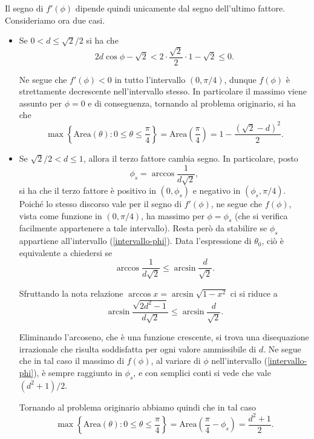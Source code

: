 {Il segno di $f'(\phi)$ dipende quindi unicamente dal segno 
dell'ultimo fattore. Consideriamo ora due casi.
\begin{itemize}
	\item  Se $0<d\leq\sqrt{2}/2$ si ha che
	$$2d\cos\phi-\sqrt{2}<2\cdot\frac{\sqrt{2}}{2}\cdot 
	1-\sqrt{2}\leq 0.$$
	
	Ne segue che $f'(\phi)<0$ in tutto l'intervallo $(0,\pi/4)$, 
	dunque $f(\phi)$ \`{e} strettamente decrescente nell'intervallo 
	stesso. In particolare il massimo viene assunto per $\phi=0$ e di 
	conseguenza, tornando al problema originario, si ha che
	$$\max\left\{\mbox{Area}(\theta):
	0\leq\theta\leq\frac{\pi}{4}\right\}=
	\mbox{Area}\left(\frac{\pi}{4}\right)=
	1-\frac{\left(\sqrt{2}-d\right)^{2}}{2}.$$

	\item  Se $\sqrt{2}/2<d\leq 1$, allora il terzo fattore cambia 
	segno. In particolare, posto
	$$\phi_{s}=\arccos\frac{1}{d\sqrt{2}},$$
	si ha che il terzo fattore \`{e} positivo in $(0,\phi_{s})$ e
	negativo in $(\phi_{s},\pi/4)$.  Poich\'{e} lo stesso discorso
	vale per il segno di $f'(\phi)$, ne segue che $f(\phi)$, vista
	come funzione in $(0,\pi/4)$, ha massimo per $\phi=\phi_{s}$ (che
	si verifica facilmente appartenere a tale intervallo).  Resta
	per\`{o} da stabilire se $\phi_{s}$ appartiene all'intervallo
	(\ref{intervallo-phi}).  Data l'espressione di $\theta_{0}$,
	ci\`{o} \`{e} equivalente a chiedersi se
	$$\arccos\frac{1}{d\sqrt{2}}\leq\arcsin\frac{d}{\sqrt{2}}.$$
	
	Sfruttando la nota relazione $\arccos x=\arcsin\sqrt{1-x^{2}}$ ci si 
	riduce a
	$$\arcsin\frac{\sqrt{2d^{2}-1}}{d\sqrt{2}}\leq
	\arcsin\frac{d}{\sqrt{2}}.$$
	
	Eliminando l'arcoseno, che \`{e} una funzione crescente, si trova 
	una disequazione irrazionale che risulta soddisfatta per ogni 
	valore ammissibile di $d$. Ne segue che in tal caso il massimo di 
	$f(\phi)$, al variare di $\phi$ nell'intervallo 
	(\ref{intervallo-phi}), \`{e} sempre raggiunto in $\phi_{s}$, e 
	con semplici conti si vede che vale $(d^{2}+1)/2$. 
	
	Tornando al problema originario abbiamo quindi che in tal caso
	$$\max\left\{\mbox{Area}(\theta):
	0\leq\theta\leq\frac{\pi}{4}\right\}=
	\mbox{Area}\left(\frac{\pi}{4}-\phi_{s}\right)=
	\frac{d^{2}+1}{2}.$$
\end{itemize}


\begin{figure}[htbp]
	\hfill
	\hfill
	\hfill
	\hfill\mbox{}


\end{figure}}
